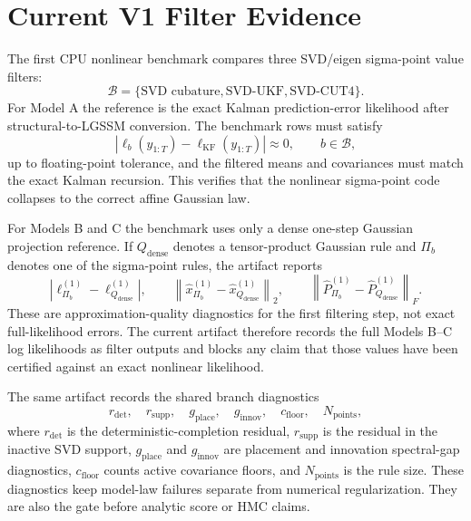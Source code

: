 \section{Current V1 Filter Evidence}
\label{sec:bf-nonlinear-current-v1-evidence}

The first CPU nonlinear benchmark compares three SVD/eigen sigma-point value
filters:
\[
  \mathcal B=\{\text{SVD cubature},\text{SVD-UKF},\text{SVD-CUT4}\}.
\]
For Model A the reference is the exact Kalman prediction-error likelihood after
structural-to-LGSSM conversion.  The benchmark rows must satisfy
\[
  \left|\ell_b(y_{1:T})-\ell_{\mathrm{KF}}(y_{1:T})\right|\approx 0,
  \qquad b\in\mathcal B,
\]
up to floating-point tolerance, and the filtered means and covariances must
match the exact Kalman recursion.  This verifies that the nonlinear
sigma-point code collapses to the correct affine Gaussian law.

For Models B and C the benchmark uses only a dense one-step Gaussian projection
reference.  If \(Q_{\mathrm{dense}}\) denotes a tensor-product Gaussian rule and
\(\Pi_b\) denotes one of the sigma-point rules, the artifact reports
\[
  \left|\ell^{(1)}_{\Pi_b}-\ell^{(1)}_{Q_{\mathrm{dense}}}\right|,\qquad
  \left\|\hat x^{(1)}_{\Pi_b}-\hat x^{(1)}_{Q_{\mathrm{dense}}}\right\|_2,
  \qquad
  \left\|\hat P^{(1)}_{\Pi_b}-\hat P^{(1)}_{Q_{\mathrm{dense}}}\right\|_F.
\]
These are approximation-quality diagnostics for the first filtering step, not
exact full-likelihood errors.  The current artifact therefore records the full
Models B--C log likelihoods as filter outputs and blocks any claim that those
values have been certified against an exact nonlinear likelihood.

The same artifact records the shared branch diagnostics
\[
  r_{\mathrm{det}},\quad r_{\mathrm{supp}},\quad
  g_{\mathrm{place}},\quad g_{\mathrm{innov}},\quad
  c_{\mathrm{floor}},\quad N_{\mathrm{points}},
\]
where \(r_{\mathrm{det}}\) is the deterministic-completion residual,
\(r_{\mathrm{supp}}\) is the residual in the inactive SVD support,
\(g_{\mathrm{place}}\) and \(g_{\mathrm{innov}}\) are placement and innovation
spectral-gap diagnostics, \(c_{\mathrm{floor}}\) counts active covariance
floors, and \(N_{\mathrm{points}}\) is the rule size.  These diagnostics keep
model-law failures separate from numerical regularization.  They are also the
gate before analytic score or HMC claims.

